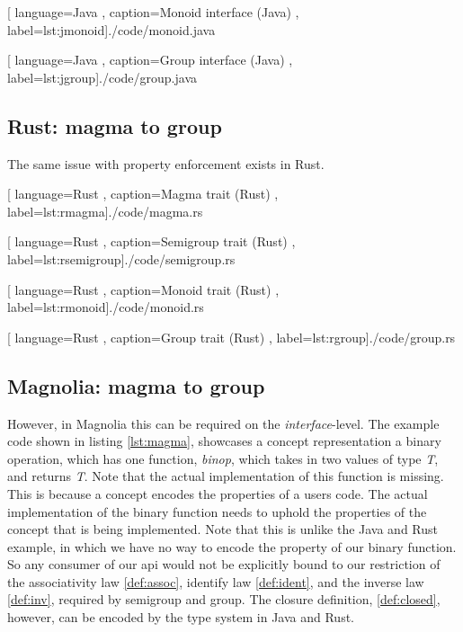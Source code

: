 \begin{center}
  
    [ language=Java
    , caption={Monoid interface (Java)}
    , label=lst:jmonoid]{./code/monoid.java}
\end{center}

\begin{center}
  
    [ language=Java
    , caption={Group interface (Java)}
    , label=lst:jgroup]{./code/group.java}
\end{center}

\subsection{Rust: magma to group}

The same issue with property enforcement exists in Rust.

\begin{center}
  
    [ language=Rust
    , caption={Magma trait (Rust)}
    , label=lst:rmagma]{./code/magma.rs}
\end{center}

\begin{center}
  
    [ language=Rust
    , caption={Semigroup trait (Rust)}
    , label=lst:rsemigroup]{./code/semigroup.rs}
\end{center}

\begin{center}
  
    [ language=Rust
    , caption={Monoid trait (Rust)}
    , label=lst:rmonoid]{./code/monoid.rs}
\end{center}

\begin{center}
  
    [ language=Rust
    , caption={Group trait (Rust)}
    , label=lst:rgroup]{./code/group.rs}
\end{center}

\subsection{Magnolia: magma to group}

However, in Magnolia this can be required on the \textit{interface}-level. The
example code shown in listing \ref{lst:magma}, showcases a concept
representation a binary operation, which has one function, \textit{binop}, which
takes in two values of type \textit{T}, and returns \textit{T}. Note that the
actual implementation of this function is missing. This is because a concept
encodes the properties of a users code. The actual implementation of the
binary function needs to uphold the properties of the concept that is
being implemented. Note that this is unlike the Java and Rust example, in
which we have no way to encode the property of our binary function. So any
consumer of our \gls*{api} would not be explicitly bound to our restriction of
the associativity law \ref{def:assoc}, identify law \ref{def:ident}, and the
inverse law \ref{def:inv}, required by semigroup and group. The closure
definition, \ref{def:closed}, however, can be encoded by the type system in Java
and Rust.

